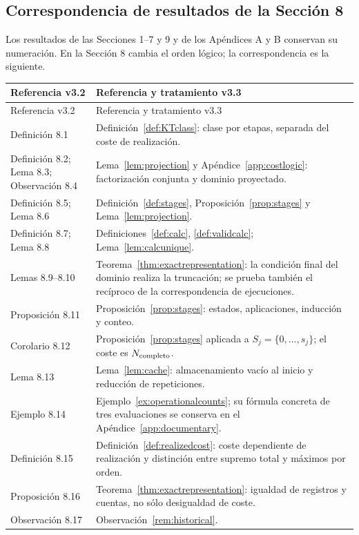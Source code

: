 \documentclass[11pt,a4paper]{article}
\numberwithin{equation}{section}
\theoremstyle{definition}
\theoremstyle{remark}
\begin{document}
\subsection{Correspondencia de resultados de la Sección 8}
Los resultados de las Secciones 1--7 y 9 y de los Apéndices A y B conservan su numeración. En la Sección 8 cambia el orden lógico; la correspondencia es la siguiente.
\begin{longtable}{@{}p{}p{}@{}}
\toprule
Referencia v3.2 & Referencia y tratamiento v3.3\\\midrule
\endfirsthead
\toprule Referencia v3.2 & Referencia y tratamiento v3.3\\\midrule\endhead
Definición 8.1 & Definición~\ref{def:KTclass}: clase por etapas, separada del coste de realización.\\[3pt]
Definición 8.2; Lema 8.3; Observación 8.4 & Lema~\ref{lem:projection} y Apéndice~\ref{app:costlogic}: factorización conjunta y dominio proyectado.\\[3pt]
Definición 8.5; Lema 8.6 & Definición~\ref{def:stages}, Proposición~\ref{prop:stages} y Lema~\ref{lem:projection}.\\[3pt]
Definición 8.7; Lema 8.8 & Definiciones~\ref{def:calc}, \ref{def:validcalc}; Lema~\ref{lem:calcunique}.\\[3pt]
Lemas 8.9--8.10 & Teorema~\ref{thm:exactrepresentation}: la condición final del dominio realiza la truncación; se prueba también el recíproco de la correspondencia de ejecuciones.\\[3pt]
Proposición 8.11 & Proposición~\ref{prop:stages}: estados, aplicaciones, inducción y conteo.\\[3pt]
Corolario 8.12 & Proposición~\ref{prop:stages} aplicada a $S_j=\{0,\ldots,s_j\}$; el coste es $N_{\rm completo}$.\\[3pt]
Lema 8.13 & Lema~\ref{lem:cache}: almacenamiento vacío al inicio y reducción de repeticiones.\\[3pt]
Ejemplo 8.14 & Ejemplo~\ref{ex:operationalcounts}; su fórmula concreta de tres evaluaciones se conserva en el Apéndice~\ref{app:documentary}.\\[3pt]
Definición 8.15 & Definición~\ref{def:realizedcost}: coste dependiente de realización y distinción entre supremo total y máximos por orden.\\[3pt]
Proposición 8.16 & Teorema~\ref{thm:exactrepresentation}: igualdad de registros y cuentas, no sólo desigualdad de coste.\\[3pt]
Observación 8.17 & Observación~\ref{rem:historical}.\\[3pt]

\end{longtable}
\end{document}
